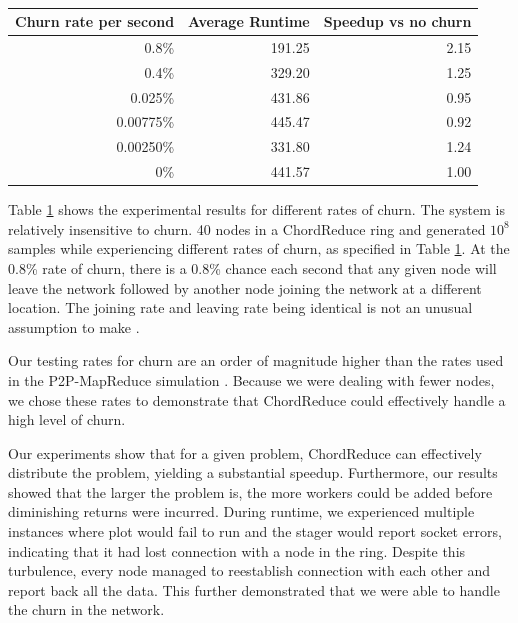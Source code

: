 \documentclass[10pt, conference, compsocconf]{IEEEtran}
\begin{document}
\begin{table}
    \centering
    \begin{tabular}{|r|r|r|} 
        \hline 
        Churn rate per second & Average Runtime & Speedup vs no churn\\ \hline{}
        0.8\% & 191.25 & 2.15 \\ \hline
        0.4\% & 329.20 & 1.25 \\ \hline
        0.025\% & 431.86 & 0.95 \\ \hline 
        0.00775\%  & 445.47 & 0.92 \\ \hline 
        0.00250\% & 331.80  &  1.24 \\ \hline 
        0\% & 441.57 & 1.00 \\ \hline
    \end{tabular}
    \caption{} 
    \label{churnSpeed}
\end{table}


Table \ref{churnSpeed} shows the experimental results for different rates of churn. The system is relatively insensitive to churn.  40 nodes in a ChordReduce ring and generated $10^{8}$ samples while experiencing different rates of churn, as specified in Table \ref{churnSpeed}.  At the 0.8\% rate of churn, there is a 0.8\% chance each second that any given node will leave the network followed by another node joining the network at a different location. The joining rate and leaving rate being identical is not an unusual assumption to make \cite{marozzo2012p2p} \cite{load}.  

Our testing rates for churn are an order of magnitude higher than the rates used in the P2P-MapReduce simulation  \cite{marozzo2012p2p}.  Because we were dealing with fewer nodes, we chose these rates to demonstrate that ChordReduce could effectively handle a high level of churn.  


Our experiments show that for a given problem, ChordReduce can effectively distribute the problem, yielding a substantial speedup.  Furthermore, our results showed that the larger the problem is, the more workers could be added before diminishing returns were incurred.  During runtime, we experienced multiple instances where plot would fail to run and the stager would report socket errors, indicating that it had lost connection with a node in the ring.  Despite this turbulence, every node managed to reestablish connection with each other and report back all the data.  This further demonstrated that we were able to handle the churn in the network.
\end{document}
